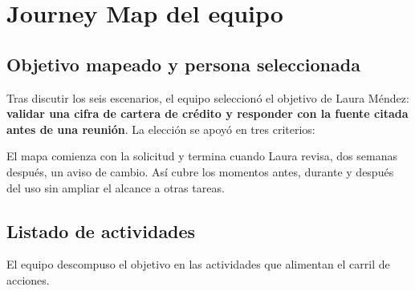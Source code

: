 \clearpage
\section{Journey Map del equipo}\label{sec:journey}

\subsection{Objetivo mapeado y persona seleccionada}

Tras discutir los seis escenarios, el equipo seleccionó el objetivo de Laura Méndez:
\textbf{validar una cifra de cartera de crédito y responder con la fuente citada antes de una
reunión}. La elección se apoyó en tres criterios:

\begin{uxlist}
\end{uxlist}

El mapa comienza con la solicitud y termina cuando Laura revisa, dos semanas después, un aviso
de cambio. Así cubre los momentos antes, durante y después del uso sin ampliar el alcance a
otras tareas.

\subsection{Listado de actividades}

El equipo descompuso el objetivo en las actividades que alimentan el carril de acciones.

